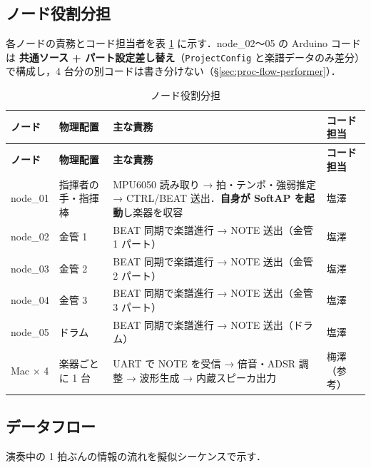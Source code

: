 \documentclass[lualatex,book,paper=a4paper,jafontsize=11.5pt,jafontscale=1.05]{jlreq}
\begin{document}
\subsection{ノード役割分担}

各ノードの責務とコード担当者を表 \ref{tab:node-roles} に示す．node\_02〜05 の Arduino
コードは \textbf{共通ソース + パート設定差し替え}（\texttt{ProjectConfig} と楽譜データのみ差分）
で構成し，4 台分の別コードは書き分けない（\S\ref{sec:proc-flow-performer}）．

\begin{longtable}{l p{} p{} l}
\caption{ノード役割分担}\label{tab:node-roles}\\
\toprule
\textbf{ノード} & \textbf{物理配置} & \textbf{主な責務} & \textbf{コード担当} \\
\midrule
\endfirsthead
\toprule
\textbf{ノード} & \textbf{物理配置} & \textbf{主な責務} & \textbf{コード担当} \\
\midrule
\endhead
node\_01 & 指揮者の手・指揮棒 & MPU6050 読み取り → 拍・テンポ・強弱推定 → CTRL/BEAT 送出．\textbf{自身が SoftAP を起動}し楽器を収容 & 塩澤 \\
node\_02 & 金管 1             & BEAT 同期で楽譜進行 → NOTE 送出（金管 1 パート） & 塩澤 \\
node\_03 & 金管 2             & BEAT 同期で楽譜進行 → NOTE 送出（金管 2 パート） & 塩澤 \\
node\_04 & 金管 3             & BEAT 同期で楽譜進行 → NOTE 送出（金管 3 パート） & 塩澤 \\
node\_05 & ドラム             & BEAT 同期で楽譜進行 → NOTE 送出（ドラム） & 塩澤 \\
Mac $\times$ 4 & 楽器ごとに 1 台 & UART で NOTE を受信 → 倍音・ADSR 調整 → 波形生成 → 内蔵スピーカ出力 & 梅澤（参考） \\
\bottomrule
\end{longtable}

\subsection{データフロー}

演奏中の 1 拍ぶんの情報の流れを擬似シーケンスで示す．
\end{document}
